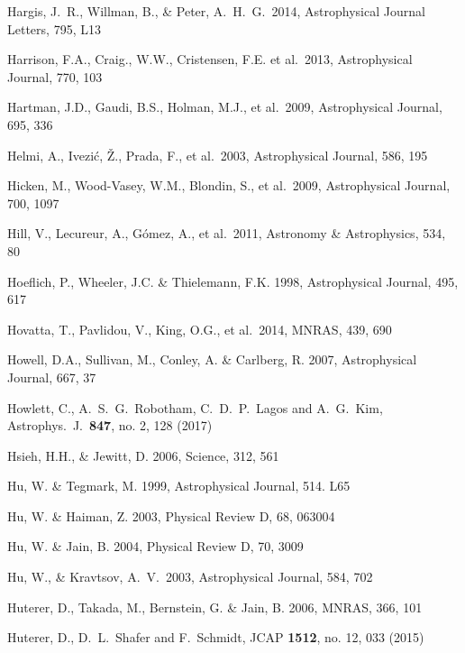 \documentclass[twocolumn]{aastex61}
\begin{document}
\begin{thebibliography}{}
 Hargis, J.~R., Willman, B., \& Peter, A.~H.~G.\ 2014, Astrophysical Journal Letters, 795, L13

 Harrison, F.A., Craig., W.W., Cristensen, F.E. et al.~2013, Astrophysical Journal, 770, 103

 Hartman, J.D., Gaudi, B.S., Holman, M.J., et al.~2009, Astrophysical Journal, 695, 336

 Helmi, A., Ivezi\'{c}, \v{Z}., Prada, F., et al.~2003, Astrophysical Journal, 586, 195

 Hicken, M., Wood-Vasey, W.M., Blondin, S., et al.~2009, Astrophysical Journal, 700, 1097

 Hill, V., Lecureur, A., G{\'o}mez, A., et al.~2011, Astronomy \& Astrophysics, 534, 80

 Hoeflich, P., Wheeler, J.C. \& Thielemann, F.K. 1998, Astrophysical Journal, 495, 617

 Hovatta, T., Pavlidou, V., King, O.G., et al.~2014, MNRAS, 439, 690

 Howell, D.A., Sullivan, M., Conley, A. \& Carlberg, R. 2007, Astrophysical Journal, 667, 37

 Howlett, C., A.~S.~G.~Robotham, C.~D.~P.~Lagos and A.~G.~Kim, Astrophys.\ J.\  {\bf 847}, no. 2, 128 (2017)

 Hsieh, H.H., \& Jewitt, D. 2006, Science, 312, 561

 Hu, W. \& Tegmark, M. 1999, Astrophysical Journal, 514. L65

 Hu, W. \& Haiman, Z. 2003, Physical Review D, 68, 063004

 Hu, W. \& Jain, B. 2004, Physical Review D, 70, 3009

 Hu, W., \& Kravtsov, A.~V.\ 2003, Astrophysical Journal, 584, 702

 Huterer, D., Takada, M., Bernstein, G. \& Jain, B. 2006, MNRAS, 366, 101

 Huterer, D., D.~L.~Shafer and F.~Schmidt, JCAP {\bf 1512}, no. 12, 033 (2015)


\end{thebibliography}
\end{document}
